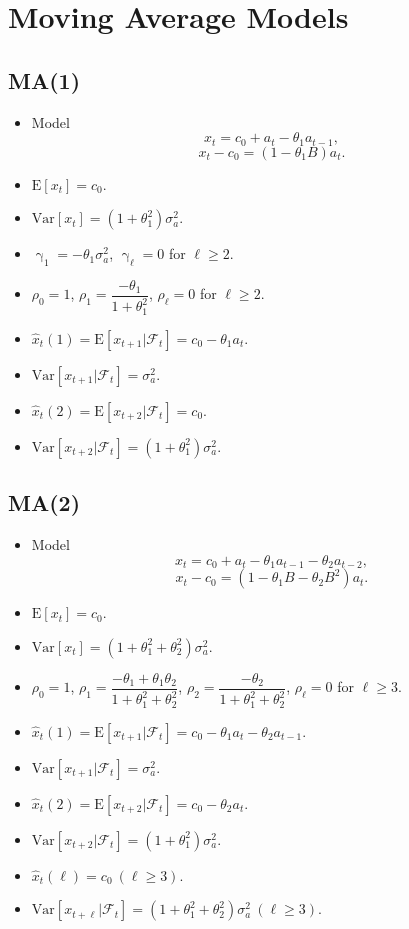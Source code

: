 \documentclass{report}
\theoremstyle{nonumberplain}
\newcommand{\E}{\mathrm{E}}
\newcommand{\Var}{\mathrm{Var}}
\newcommand{\0}{\mathbf{0}}
\begin{document}
\section{Moving Average Models}
\subsection{MA(1)}
\begin{itemize}
	\item Model
	\[
	x_{t}=c_0+a_t-\theta_1a_{t-1},
	\]
	\[
	x_{t}-c_0=(1-\theta_1B)a_t.
	\]
	\item $\E[x_t]=c_0$.
	\item $\Var[x_t]=(1+\theta_1^2)\sigma_a^2$.
	\item $\upgamma_1=-\theta_1\sigma_a^2$, $\upgamma_\ell=0$ for $\ell\ge2$.
	\item $\rho_0=1$, $\rho_1=\dfrac{-\theta_1}{1+\theta_1^2}$, $\rho_\ell=0$ for $\ell\ge2$.
	\item $\hat{x}_t(1)=\E[x_{t+1}|\mathcal{F}_t]=c_0-\theta_1a_{t}$.
	\item $\Var[x_{t+1}|\mathcal{F}_t]=\sigma_a^2$.
	\item $\hat{x}_t(2)=\E[x_{t+2}|\mathcal{F}_t]=c_0$.
	\item $\Var[x_{t+2}|\mathcal{F}_t]=(1+\theta_1^2)\sigma_a^2$.
\end{itemize}

\subsection{MA(2)}
\begin{itemize}
	\item Model
	\[
	x_{t}=c_0+a_t-\theta_1a_{t-1}-\theta_2a_{t-2},
	\]
	\[
	x_{t}-c_0=(1-\theta_1B-\theta_2B^2)a_t.
	\]
	\item $\E[x_t]=c_0$.
	\item $\Var[x_t]=(1+\theta_1^2+\theta_2^2)\sigma_a^2$.
	\item $\rho_0=1$, $\rho_1=\dfrac{-\theta_1+\theta_1\theta_2}{1+\theta_1^2+\theta_2^2}$, $\rho_2=\dfrac{-\theta_2}{1+\theta_1^2+\theta_2^2}$, $\rho_\ell=0$ for $\ell\ge3$.
	\item $\hat{x}_t(1)=\E[x_{t+1}|\mathcal{F}_t]=c_0-\theta_1a_{t}-\theta_2a_{t-1}$.
	\item $\Var[x_{t+1}|\mathcal{F}_t]=\sigma_a^2$.
	\item $\hat{x}_t(2)=\E[x_{t+2}|\mathcal{F}_t]=c_0-\theta_2a_{t}$.
	\item $\Var[x_{t+2}|\mathcal{F}_t]=(1+\theta_1^2)\sigma_a^2$.
	\item $\hat{x}_t(\ell)=c_0\ (\ell\ge3)$.
	\item $\Var[x_{t+\ell}|\mathcal{F}_t]=(1+\theta_1^2+\theta_2^2)\sigma_a^2\ (\ell\ge3)$.
\end{itemize}
\end{document}
